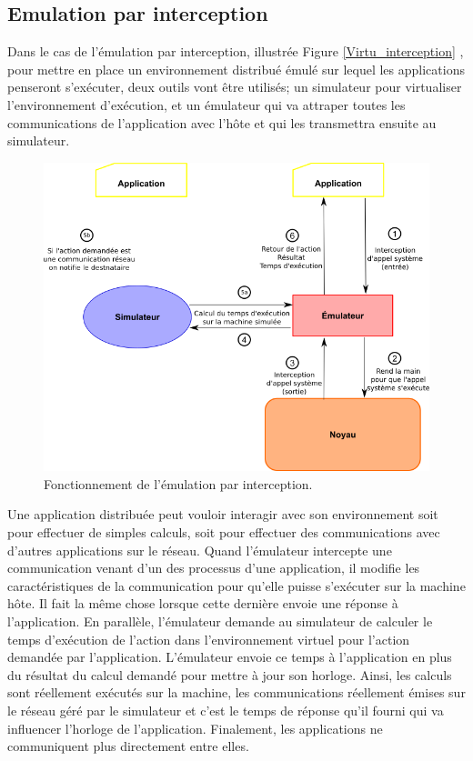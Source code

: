 \subsection{Emulation par interception}
\label{section:interception}

Dans le cas de l'émulation par interception, illustrée
Figure \ref{Virtu_interception} , pour mettre en place un environnement distribué
émulé sur lequel les applications penseront s'exécuter, deux outils vont être
utilisés; un simulateur pour virtualiser l'environnement d'exécution, et un
émulateur qui va attraper toutes les communications de l'application avec l'hôte
et qui les transmettra ensuite au simulateur.

 \begin{figure}[H]
   \centering \includegraphics[scale=0.5]{Pictures/png/Emulation_fonctionnement}
   \caption{Fonctionnement de l'émulation par interception.}
   \label{INTERCEPTION}
 \end{figure}
 
 Une application distribuée peut vouloir interagir avec son environnement soit
 pour effectuer de simples calculs, soit pour effectuer des communications avec
 d'autres applications sur le réseau. Quand l'émulateur intercepte une
 communication venant d'un des processus d'une application, il modifie les
 caractéristiques de la communication pour qu'elle puisse s'exécuter sur la
 machine hôte. Il fait la même chose lorsque cette dernière envoie une réponse à
 l'application. En parallèle, l'émulateur demande au simulateur de calculer le
 temps d'exécution de l'action dans l'environnement virtuel pour l'action
 demandée par l'application. L'émulateur envoie ce temps à l'application en plus
 du résultat du calcul demandé pour mettre à jour son horloge. Ainsi, les
 calculs sont réellement exécutés sur la machine, les communications réellement
 émises sur le réseau géré par le simulateur et c'est le temps de réponse qu'il
 fourni qui va influencer l'horloge de l'application. Finalement, les
 applications ne communiquent plus directement entre elles.

